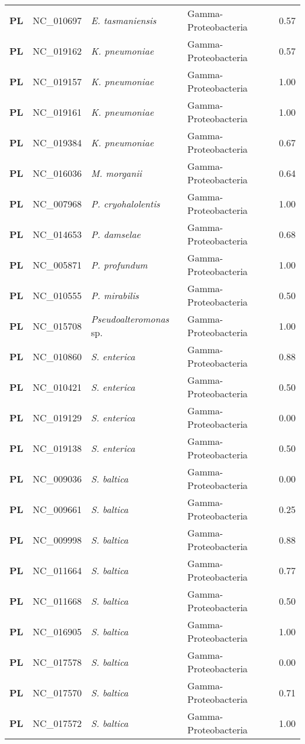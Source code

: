 \begin{adjustwidth}{-3cm}{2cm}
{\begin{supertabular}{>{\bfseries}l|p{0.1\textwidth}p{0.14\textwidth}l|l}
PL & NC\_010697 & \textit{E. tasmaniensis} & Gamma-Proteobacteria & 0.57\\
PL & NC\_019162 & \textit{K. pneumoniae} & Gamma-Proteobacteria & 0.57\\
PL & NC\_019157 & \textit{K. pneumoniae} & Gamma-Proteobacteria & 1.00\\
PL & NC\_019161 & \textit{K. pneumoniae} & Gamma-Proteobacteria & 1.00\\
PL & NC\_019384 & \textit{K. pneumoniae} & Gamma-Proteobacteria & 0.67\\
PL & NC\_016036 & \textit{M. morganii} & Gamma-Proteobacteria & 0.64\\
PL & NC\_007968 & \textit{P. cryohalolentis} & Gamma-Proteobacteria & 1.00\\
PL & NC\_014653 & \textit{P. damselae} & Gamma-Proteobacteria & 0.68\\
PL & NC\_005871 & \textit{P. profundum} & Gamma-Proteobacteria & 1.00\\
PL & NC\_010555 & \textit{P. mirabilis} & Gamma-Proteobacteria & 0.50\\
PL & NC\_015708 & \textit{Pseudoalteromonas} sp. & Gamma-Proteobacteria & 1.00\\
PL & NC\_010860 & \textit{S. enterica} & Gamma-Proteobacteria & 0.88\\
PL & NC\_010421 & \textit{S. enterica} & Gamma-Proteobacteria & 0.50\\
PL & NC\_019129 & \textit{S. enterica} & Gamma-Proteobacteria & 0.00\\
PL & NC\_019138 & \textit{S. enterica} & Gamma-Proteobacteria & 0.50\\
PL & NC\_009036 & \textit{S. baltica} & Gamma-Proteobacteria & 0.00\\
PL & NC\_009661 & \textit{S. baltica} & Gamma-Proteobacteria & 0.25\\
PL & NC\_009998 & \textit{S. baltica} & Gamma-Proteobacteria & 0.88\\
PL & NC\_011664 & \textit{S. baltica} & Gamma-Proteobacteria & 0.77\\
PL & NC\_011668 & \textit{S. baltica} & Gamma-Proteobacteria & 0.50\\
PL & NC\_016905 & \textit{S. baltica} & Gamma-Proteobacteria & 1.00\\
PL & NC\_017578 & \textit{S. baltica} & Gamma-Proteobacteria & 0.00\\
PL & NC\_017570 & \textit{S. baltica} & Gamma-Proteobacteria & 0.71\\
PL & NC\_017572 & \textit{S. baltica} & Gamma-Proteobacteria & 1.00\\

\end{supertabular}}
\end{adjustwidth}
